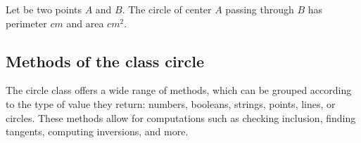 Let be two points $A$ and $B$.
The circle of center $A$ passing through $B$ has perimeter  $cm$ and area $cm^2$.


\newpage
\subsection{Methods of the class circle}
The circle class offers a wide range of methods, which can be grouped according to the type of value they return: numbers, booleans, strings, points, lines, or circles. These methods allow for computations such as checking inclusion, finding tangents, computing inversions, and more.

\vspace{1em}

\bgroup
  \small
  \label{circle:methods}
